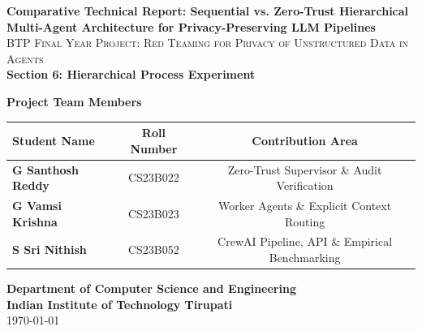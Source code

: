 \documentclass[10pt,a4paper]{article}
\begin{document}
\begin{titlepage}
    \centering
    \vspace*{0.5cm}
    
    {\Huge \bfseries \textcolor{primaryblue}{Comparative Technical Report: Sequential vs. Zero-Trust Hierarchical Multi-Agent Architecture for Privacy-Preserving LLM Pipelines}}\\[0.8cm]
    
    {\Large \textsc{BTP Final Year Project: Red Teaming for Privacy of Unstructured Data in Agents}}\\[0.4cm]
    {\large \textbf{Section 6: Hierarchical Process Experiment}}\\[1.5cm]

    \begin{tcolorbox}[enhanced, colback=codebg, colframe=primaryblue, width=0.92\textwidth, arc=4mm, boxrule=1.2pt]
        \centering
        \vspace{0.3cm}
        {\large \textbf{Project Team Members}}\\[0.4cm]
        \begin{tabularx}{0.85\textwidth}{X c c}
            \toprule
            \textbf{Student Name} & \textbf{Roll Number} & \textbf{Contribution Area} \\
            \midrule
            \textbf{G Santhosh Reddy} & CS23B022 & Zero-Trust Supervisor \& Audit Verification \\
            \textbf{G Vamsi Krishna} & CS23B023 & Worker Agents \& Explicit Context Routing \\
            \textbf{S Sri Nithish} & CS23B052 & CrewAI Pipeline, API \& Empirical Benchmarking \\
            \bottomrule
        \end{tabularx}
        \vspace{0.3cm}
    \end{tcolorbox}

    \vfill

    \begin{center}
        \textbf{Department of Computer Science and Engineering}\\
        \textbf{Indian Institute of Technology Tirupati}\\
        \vspace{0.3cm}
        \today
    \end{center}
    
    \vspace{0.8cm}
\end{titlepage}
\end{document}
